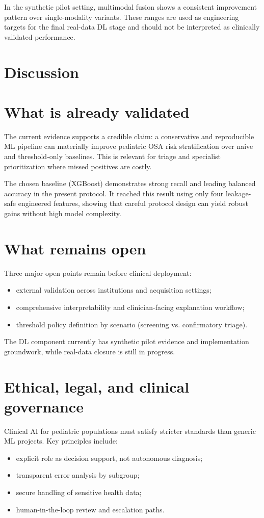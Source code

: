 \documentclass[10pt,a4paper,twocolumn]{article}
\newcommand{\chapter}[1]{\section{#1}}
\begin{document}
In the synthetic pilot setting, multimodal fusion shows a consistent improvement pattern over single-modality variants. These ranges are used as engineering targets for the final real-data DL stage and should not be interpreted as clinically validated performance.

\chapter{Discussion}
\section{What is already validated}
The current evidence supports a credible claim: a conservative and reproducible ML pipeline can materially improve pediatric OSA risk stratification over naive and threshold-only baselines. This is relevant for triage and specialist prioritization where missed positives are costly.

The chosen baseline (XGBoost) demonstrates strong recall and leading balanced accuracy in the present protocol. It reached this result using only four leakage-safe engineered features, showing that careful protocol design can yield robust gains without high model complexity.

\section{What remains open}
Three major open points remain before clinical deployment:
\begin{itemize}[leftmargin=1.2cm]
    \item external validation across institutions and acquisition settings;
    \item comprehensive interpretability and clinician-facing explanation workflow;
    \item threshold policy definition by scenario (screening vs. confirmatory triage).
\end{itemize}

The DL component currently has synthetic pilot evidence and implementation groundwork, while real-data closure is still in progress.

\section{Ethical, legal, and clinical governance}
Clinical AI for pediatric populations must satisfy stricter standards than generic ML projects. Key principles include:
\begin{itemize}[leftmargin=1.2cm]
    \item explicit role as decision support, not autonomous diagnosis;
    \item transparent error analysis by subgroup;
    \item secure handling of sensitive health data;
    \item human-in-the-loop review and escalation paths.
\end{itemize}
\end{document}
